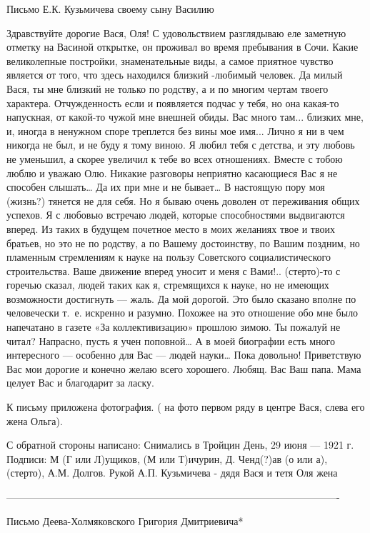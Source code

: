Письмо Е.К. Кузьмичева своему сыну Василию


Здравствуйте дорогие Вася, Оля!
С удовольствием разглядываю еле заметную отметку на  Васиной открытке, он проживал во время пребывания в Сочи. Какие великолепные постройки, знаменательные виды, а самое приятное чувство является от того, что здесь находился близкий -любимый человек. Да милый Вася, ты мне близкий не только по родству, а и по многим чертам твоего характера. Отчужденность если и появляется подчас у тебя, но она какая-то напускная, от какой-то чужой  мне внешней обиды. Вас много там... близких мне, и, иногда в ненужном споре треплется без вины мое имя... Лично я ни в чем никогда не был, и не буду я тому виною. Я любил тебя с детства, и эту любовь не уменьшил, а скорее увеличил к тебе во всех отношениях. Вместе с тобою люблю и уважаю Олю. Никакие разговоры неприятно касающиеся Вас я не способен слышать… Да их при мне и не бывает…
В настоящую пору моя (жизнь?) тянется не для себя. Но я бываю очень доволен от переживания общих успехов. Я с любовью встречаю людей, которые способностями выдвигаются вперед. Из таких в будущем почетное место в моих желаниях твое и твоих братьев, но это не по родству, а по Вашему достоинству, по Вашим поздним, но пламенным стремлениям к науке на пользу Советского социалистического строительства. 
Ваше движение вперед уносит и меня с Вами!..
(стерто)-то с горечью сказал, людей таких как я, стремящихся к науке, но не имеющих возможности достигнуть — жаль. Да мой дорогой. Это было сказано вполне по человечески т. е. искренно и разумно. Похожее на это отношение обо мне было напечатано в газете «За коллективизацию» прошлою зимою. Ты пожалуй не читал? Напрасно, пусть я учен поповной… А в моей биографии есть много интересного — особенно для Вас — людей науки… Пока довольно! Приветствую Вас мои дорогие и конечно желаю всего хорошего.
Любящ. Вас Ваш папа.
Мама целует Вас и благодарит за ласку.

К письму приложена фотография. ( на фото первом ряду в центре Вася, слева его жена Ольга).  

С обратной стороны написано:
Снимались в Тройцин День, 29 июня — 1921 г.
Подписи: М (Г или Л)ущиков, (М или Т)ичурин, Д. Ченд(?)ав (о или а),  (стерто), А.М. Долгов. 
Рукой А.П. Кузьмичева -  дядя Вася и тетя Оля жена 

----------------------------------------------------------------------------------------------------

Письмо Деева-Холмяковского Григория Дмитриевича*


